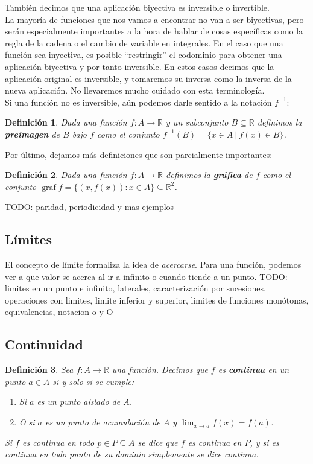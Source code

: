 \documentclass{article}
\newtheorem{define}{Definición}
\DeclareMathOperator{\graf}{graf}
\newcommand{\reales}{\mathbb{R}}
\begin{document}
También decimos que una aplicación biyectiva es inversible o invertible.\\ 
La mayoría de funciones que nos vamos a encontrar no van a ser biyectivas, pero serán especialmente importantes a la hora de hablar de cosas específicas como la regla de la cadena o el cambio de variable en integrales. En el caso que una función sea inyectiva, es posible ``restringir'' el codominio para obtener una aplicación biyectiva y por tanto inversible. En estos casos decimos que la aplicación original es inversible, y tomaremos su inversa como la inversa de la nueva aplicación. No llevaremos mucho cuidado con esta terminología.\\ 
Si una función no es inversible, aún podemos darle sentido a la notación $f^{-1}$:

\begin{define}
	Dada una función $f: A \rightarrow \reales$ y un subconjunto $B \subseteq \reales$ definimos la \textbf{preimagen} de $B$ bajo $f$ como el conjunto $f^{-1}(B) = \{x \in A\ | \ f(x) \in B \}$.
\end{define}

Por último, dejamos más definiciones que son parcialmente importantes:

\begin{define}
	Dada una función $f: A \rightarrow \reales$ definimos la \textbf{gráfica} de $f$ como el conjunto $\graf f = \{(x, f(x)) : x \in A \} \subseteq \reales^2$.
\end{define}

TODO: paridad, periodicidad y mas ejemplos




\subsection{Límites}
El concepto de límite formaliza la idea de \textit{acercarse}. Para una función, podemos ver a que valor se acerca al ir a infinito o cuando tiende a un punto.
TODO: limites en un punto e infinito, laterales, caracterización por sucesiones, operaciones con limites, limite inferior y superior, limites de funciones monótonas, equivalencias, notacion o y O

\subsection{Continuidad}
\begin{define}
	Sea $f: A \rightarrow \reales$ una función. Decimos que $f$ es \textbf{continua} en un punto $a \in A$ si y solo si se cumple:
	\begin{enumerate}
		\item
		Si $a$ es un punto aislado de $A$.
		\item
		O si $a$ es un punto de acumulación de $A$ y $\lim_{x \rightarrow a} f(x) = f(a)$.
	\end{enumerate}
	Si $f$ es continua en todo $p \in P \subseteq A$ se dice que $f$ es continua en $P$, y si es continua en todo punto de su dominio simplemente se dice continua.
\end{define}
\end{document}
